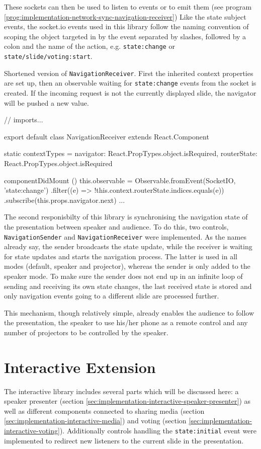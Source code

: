 These sockets can then be used to listen to events or to emit them (see program \ref{prog:implementation-network-sync-navigation-receiver}) Like the state subject events, the socket.io events used in this library follow the naming convention of scoping the object targeted in by the event separated by slashes, followed by a colon and the name of the action, e.g. \texttt{state:change} or \texttt{state/slide/voting:start}.

\begin{program}
\caption{Shortened version of \texttt{NavigationReceiver}. First the inherited context properties are set up, then an observable waiting for \texttt{state:change} events from the socket is created. If the incoming request is not the currently displayed slide, the navigator will be pushed a new value.}
\label{prog:implementation-network-sync-navigation-receiver}
\begin{JsCode}
// imports...

export default class NavigationReceiver extends React.Component {
  static contextTypes = {
    navigator:   React.PropTypes.object.isRequired,
    routerState: React.PropTypes.object.isRequired
  }

  componentDidMount () {
    this.observable = Observable.fromEvent(SocketIO, 'state:change')
      .filter((e) => !this.context.routerState.indices.equals(e))
      .subscribe(this.props.navigator.next)
  }
  ...
}
\end{JsCode}
\end{program}
%
The second responisbilty of this library is synchronising the navigation state of the presentation between speaker and audience. To do this, two controls, \texttt{NavigationSender} and \texttt{NavigationReceiver} were implemented. As the names already say, the sender broadcasts the state update, while the receiver is waiting for state updates and starts the navigation process. The latter is used in all modes (default, speaker and projector), whereas the sender is only added to the speaker mode. To make sure the sender does not end up in an infinite loop of sending and receiving its own state changes, the last received state is stored and only navigation events going to a different slide are processed further.

This mechanism, though relatively simple, already enables the audience to follow the presentation, the speaker to use his/her phone as a remote control and any number of projectors to be controlled by the speaker.

\section{Interactive Extension}
\label{sec:implementation-interactive}
The interactive library includes several parts which will be discussed here: a speaker presenter (section \ref{sec:implementation-interactive-speaker-presenter}) as well as different components connected to sharing media (section \ref{sec:implementation-interactive-media}) and voting (section \ref{sec:implementation-interactive-voting}). Additionally controls handling the \texttt{state:initial} event were implemented to redirect new listeners to the current slide in the presentation.

